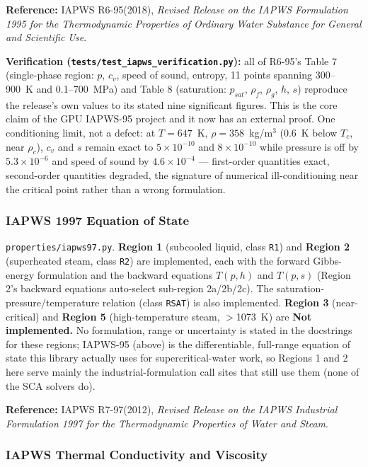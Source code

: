 \documentclass[11pt]{article}
\newcommand{\code}[1]{\texttt{#1}}
\newcommand{\notimpl}{\textbf{Not implemented.}}
\begin{document}
\textbf{Reference:} IAPWS R6-95(2018), \emph{Revised Release on the IAPWS Formulation
1995 for the Thermodynamic Properties of Ordinary Water Substance for General and
Scientific Use}.

\textbf{Verification (\code{tests/test\_iapws\_verification.py}):} all of R6-95's Table
7 (single-phase region: $p$, $c_v$, speed of sound, entropy, 11 points spanning
300--900~K and 0.1--700~MPa) and Table 8 (saturation: $p_{sat}$, $\rho_f$, $\rho_g$,
$h$, $s$) reproduce the release's own values to its stated nine significant figures.
This is the core claim of the GPU IAPWS-95 project and it now has an external proof.
One conditioning limit, not a defect: at $T=647$~K, $\rho=358$~kg/m$^3$ (0.6~K below
$T_c$, near $\rho_c$), $c_v$ and $s$ remain exact to $5\times10^{-10}$ and
$8\times10^{-10}$ while pressure is off by $5.3\times10^{-6}$ and speed of sound by
$4.6\times10^{-4}$ --- first-order quantities exact, second-order quantities degraded,
the signature of numerical ill-conditioning near the critical point rather than a wrong
formulation.

\subsubsection{IAPWS 1997 Equation of State}

\code{properties/iapws97.py}. \textbf{Region 1} (subcooled liquid, class \code{R1}) and
\textbf{Region 2} (superheated steam, class \code{R2}) are implemented, each with the
forward Gibbs-energy formulation and the backward equations $T(p,h)$ and $T(p,s)$
(Region 2's backward equations auto-select sub-region 2a/2b/2c). The
saturation-pressure/temperature relation (class \code{RSAT}) is also implemented.
\textbf{Region 3} (near-critical) and \textbf{Region 5} (high-temperature steam,
$>$1073~K) are \notimpl{} No formulation, range or uncertainty is stated in the
docstrings for these regions; IAPWS-95 (above) is the differentiable, full-range
equation of state this library actually uses for supercritical-water work, so Regions 1
and 2 here serve mainly the industrial-formulation call sites that still use them (none
of the SCA solvers do).

\textbf{Reference:} IAPWS R7-97(2012), \emph{Revised Release on the IAPWS Industrial
Formulation 1997 for the Thermodynamic Properties of Water and Steam}.

\subsubsection{IAPWS Thermal Conductivity and Viscosity}
\end{document}
